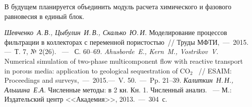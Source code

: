 \documentclass[14pt,a4paper]{extarticle}
\begin{document}
В будущем планируется объединить модуль расчета химического и фазового равновесия в единый блок.

\clearpage
{}

\begin{thebibliography}{00} %
\textit{Шевченко~А.\,В., Цыбулин~И.\,В., Скалько~Ю.\,И.}
Моделирование процессов фильтрации в коллекторах с переменной пористостью~//
Труды МФТИ,~---~2015.---~Т. 7, № 2(26). ~---~ С. 60--69.
\textit{Ahusborde~E., Kern~M., Vostrikov~V.} Numerical simulation of two-phase multicomponent flow with reactive transport in porous media: application to geological sequestration of $\text{CO}_2$ ~//
ESAIM: Proceedings and surveys,~---~2015.---~V. 50.~---~Pp. 21--39.
\textit{Калиткин~Н.\,Н., Альшина~Е.А.} Численные методы: в 2 кн. Кн. 1. Численный анализ. ~---
М.: Издательский центр <<Академия>>, 2013.~---~304~с.
\end{thebibliography}
\end{document}
